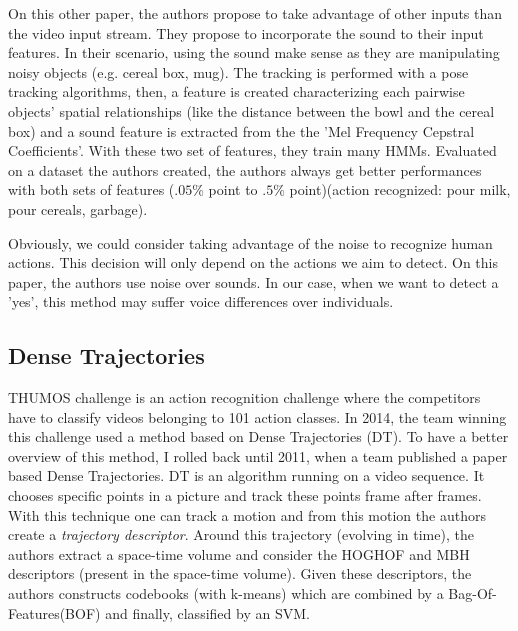 \documentclass[a4paper]{article}
\begin{document}
			On this other paper\cite{pieropan2014audio}, the authors propose to take advantage of other inputs than the video input stream. They propose to incorporate the sound to their input features. In their scenario, using the sound make sense as they are manipulating noisy objects (e.g. cereal box, mug). The tracking is performed with a pose tracking algorithms, then, a feature is created characterizing each pairwise objects’ spatial relationships (like the distance between the bowl and the cereal box) and a sound feature is extracted from the the 'Mel Frequency Cepstral Coefficients'. With these two set of features, they train many HMMs. Evaluated on a dataset the authors created, the authors always get better performances with both sets of features ($.05\%$ point to $.5 \%$ point)(action recognized: pour milk, pour cereals, garbage).

			\begin{mdframed}[backgroundcolor = gray!30]
				Obviously, we could consider taking advantage of the noise to recognize human actions. This decision will only depend on the actions we aim to detect. On this paper, the authors use noise over sounds. In our case, when we want to detect a 'yes', this method may suffer voice differences over individuals.
			\end{mdframed}

		\subsection{Dense Trajectories}
		\label{sub:dense_trajectories}
		
			THUMOS challenge\cite{THUMOS14} is an action recognition challenge where the competitors have to classify videos belonging to 101 action classes. In 2014, the team winning this challenge used a method based on Dense Trajectories (DT). To have a better overview of this method, I rolled back until 2011, when a team published a paper based Dense Trajectories\cite{wang2011action}. DT is an algorithm running on a video sequence. It chooses specific points in a picture and track these points frame after frames. With this technique one can track a motion and from this motion the authors create a \textit{trajectory descriptor}. Around this trajectory (evolving in time), the authors extract a space-time volume and consider the HOGHOF and MBH descriptors (present in the space-time volume). Given these descriptors, the authors constructs codebooks (with k-means) which are combined by a Bag-Of-Features(BOF) and finally, classified by an SVM.
\end{document}
